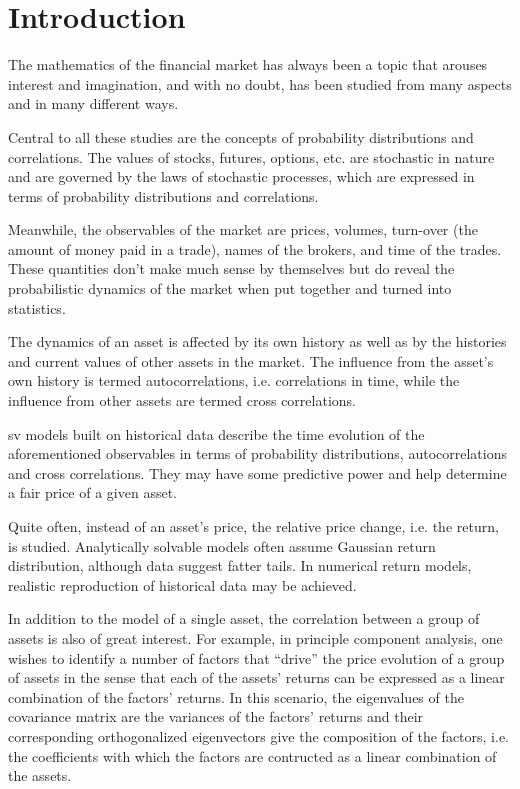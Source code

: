 \documentclass{report}
\begin{document}
\printglossaries

\chapter{Introduction}
The mathematics of the financial market has always been a topic that
arouses interest and imagination, and with no doubt, has been
studied from many aspects and in many different ways.

Central to all these studies are the concepts of probability
distributions and correlations. The values of stocks, futures,
options, etc. are stochastic in nature and are governed by the laws of
stochastic processes, which are expressed in terms of probability
distributions and correlations.

Meanwhile, the observables of the market are prices, volumes,
turn-over (the amount of money paid in a trade), names of the brokers,
and time of the trades. These quantities don't make much sense
by themselves but do reveal the probabilistic dynamics of the market
when put together and turned into statistics.

The dynamics of an asset is affected by its own history as well as by
the histories and current values of other assets in the market. The
influence from the asset's own history is termed autocorrelations,
i.e. correlations in time, while the influence from other assets are
termed cross correlations.

\Gls{sv} models built on historical data describe the time evolution
of the aforementioned observables in terms of probability
distributions, autocorrelations and cross correlations. They may have
some predictive power and help determine a fair price of a given
asset.

Quite often, instead of an asset's price, the relative price change,
i.e. the return, is studied. Analytically solvable models often assume
Gaussian return distribution, although data suggest fatter tails. In
numerical return models, realistic reproduction of historical data may
be achieved.

In addition to the model of a single asset, the correlation between
a group of assets is also of great interest. For example, in principle
component analysis, one wishes to identify a number of factors that
``drive'' the price evolution of a group of assets in the sense that
each of the assets' returns can be expressed as a linear combination
of the factors' returns. In this scenario, the eigenvalues of the
covariance matrix are the variances of the factors' returns and their
corresponding orthogonalized eigenvectors give the composition of the
factors, i.e. the coefficients with which the factors are contructed
as a linear combination of the assets.
\end{document}
